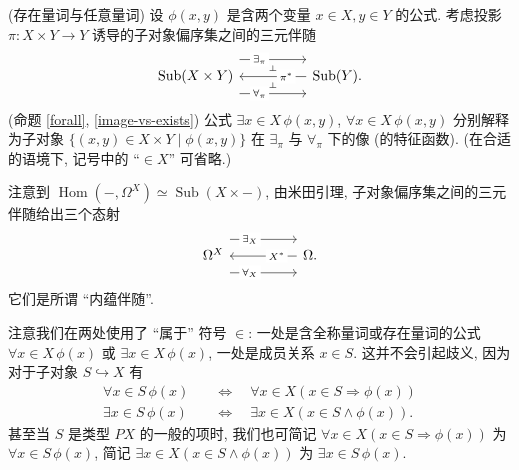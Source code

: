 \begin{example}
	{(存在量词与任意量词)}
	设 $\phi(x,y)$ 是含两个变量 $x\in X,y\in Y$ 的公式.
		考虑投影 $\pi\colon X\times Y\to Y$ 诱导的子对象偏序集之间的三元伴随
		\[\begin{tikzcd}[ampersand replacement=\&,background color=\examplecolor]
			{\operatorname{Sub}(X\times Y)} \&\& {\operatorname{Sub}(Y).}
			\arrow[""{name=0, anchor=center, inner sep=0}, "{\pi^*}"{description, pos=0.3}, from=1-3, to=1-1]
			\arrow[""{name=1, anchor=center, inner sep=0}, "{\exists_\pi}"{description, pos=0.3}, shift left=5, from=1-1, to=1-3]
			\arrow[""{name=2, anchor=center, inner sep=0}, "{\forall_\pi}"{description, pos=0.3}, shift right=5, from=1-1, to=1-3]
			\arrow["\dashv"{anchor=center, rotate=-90}, draw=none, from=1, to=0]
			\arrow["\dashv"{anchor=center, rotate=-90}, draw=none, from=0, to=2]
		\end{tikzcd}\]
		(命题 \ref{forall}, \ref{image-vs-exists})
		公式 $\exists x\in X\, \phi(x,y)$, $\forall x\in X\, \phi(x,y)$
		分别解释为子对象 $\{(x,y)\in X\times Y \mid \phi(x,y)\}$ 在 $\exists_\pi$ 与 $\forall_\pi$ 下的像 (的特征函数).
		(在合适的语境下, 记号中的 ``$\in X$'' 可省略.)

	注意到 $\operatorname{Hom}(-,\Omega^X) \simeq\operatorname{Sub}(X\times {-})$, 由米田引理, 子对象偏序集之间的三元伴随给出三个态射
	\[\begin{tikzcd}[ampersand replacement=\&,background color=\examplecolor]
		{\Omega^X} \&\& {\Omega.}
		\arrow[""{name=0, anchor=center, inner sep=0}, "{X^*}"{description, pos=0.3}, from=1-3, to=1-1]
		\arrow[""{name=1, anchor=center, inner sep=0}, "{\exists_X}"{description, pos=0.3}, shift left=5, from=1-1, to=1-3]
		\arrow[""{name=2, anchor=center, inner sep=0}, "{\forall_X}"{description, pos=0.3}, shift right=5, from=1-1, to=1-3]
	\end{tikzcd}\]
	它们是所谓 ``内蕴伴随''.
\end{example}

\begin{remark}
	{}
	注意我们在两处使用了 ``属于'' 符号 $\in$: 一处是含全称量词或存在量词的公式 $\forall x\in X\,\phi(x)$ 或 $\exists x\in X\,\phi(x)$,
	一处是成员关系 $x\in S$. 这并不会引起歧义, 因为对于子对象 $S\hookrightarrow X$ 有
	\[
	\begin{aligned}
		\forall x\in S\, \phi(x)&\quad \Leftrightarrow\quad
		\forall x\in X (x\in S\Rightarrow \phi(x))\\
		\exists x\in S\, \phi(x)&\quad \Leftrightarrow\quad
		\exists x\in X (x\in S\land \phi(x)).
	\end{aligned}
	\]
	甚至当 $S$ 是类型 $PX$ 的一般的项时, 我们也可简记 $\forall x\in X(x\in S\Rightarrow\phi(x))$ 为 $\forall x\in S\,\phi(x)$, 简记  $\exists x\in X(x\in S\land\phi(x))$ 为 $\exists x\in S\,\phi(x)$.
\end{remark}

